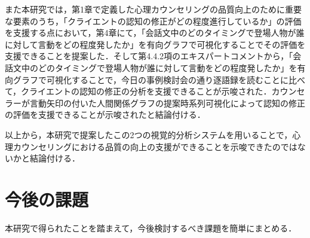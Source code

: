 \documentclass[shuuron]{kuee}
\begin{document}





また本研究では，第1章で定義した心理カウンセリングの品質向上のために重要な要素のうち，「クライエントの認知の修正がどの程度進行しているか」の評価を支援する点において，第4章にて，「会話文中のどのタイミングで登場人物が誰に対して言動をどの程度発したか」を有向グラフで可視化することでその評価を支援できることを提案した．そして第4.4.2項のエキスパートコメントから，「会話文中のどのタイミングで登場人物が誰に対して言動をどの程度発したか」を有向グラフで可視化することで，今日の事例検討会の通り逐語録を読むことに比べて，クライエントの認知の修正の分析を支援できることが示唆された．カウンセラーが言動矢印の付いた人間関係グラフの提案時系列可視化によって認知の修正の評価を支援できることが示唆されたと結論付ける．

以上から，本研究で提案したこの2つの視覚的分析システムを用いることで，心理カウンセリングにおける品質の向上の支援ができることを示唆できたのではないかと結論付ける．%


\section{今後の課題}

本研究で得られたことを踏まえて，今後検討するべき課題を簡単にまとめる．
\end{document}
